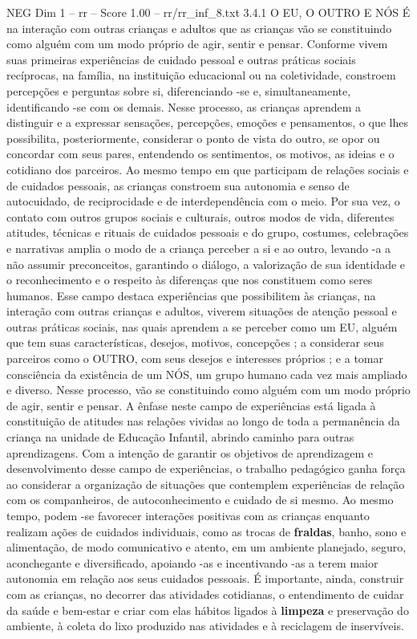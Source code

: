\begin{textsample}{NEG Dim 1 – rr – Score 1.00 – rr/rr\_inf\_8.txt}  \label{ex:f1_neg_072}
3.4.1 O EU, O OUTRO E NÓS É na interação com outras crianças e adultos que as crianças vão se constituindo como alguém com um modo próprio de agir, sentir e pensar.
Conforme vivem suas primeiras experiências de cuidado pessoal e outras práticas sociais recíprocas, na família, na instituição educacional ou na coletividade, constroem percepções e perguntas sobre si, diferenciando -se e, simultaneamente, identificando -se com os demais.
Nesse processo, as crianças aprendem a distinguir e a expressar sensações, percepções, emoções e pensamentos, o que lhes possibilita, posteriormente, considerar o ponto de vista do outro, se opor ou concordar com seus pares, entendendo os sentimentos, os motivos, as ideias e o cotidiano dos parceiros.
Ao mesmo tempo em que participam de relações sociais e de cuidados pessoais, as crianças constroem sua autonomia e senso de autocuidado, de reciprocidade e de interdependência com o meio.
Por sua vez, o contato com outros grupos sociais e culturais, outros modos de vida, diferentes atitudes, técnicas e rituais de cuidados pessoais e do grupo, costumes, celebrações e narrativas amplia o modo de a criança perceber a si e ao outro, levando -a a não assumir preconceitos, garantindo o diálogo, a valorização de sua identidade e o reconhecimento e o respeito às diferenças que nos constituem como seres humanos.
Esse campo destaca experiências que possibilitem às crianças, na interação com outras crianças e adultos, viverem situações de atenção pessoal e outras práticas sociais, nas quais aprendem a se perceber como um EU, alguém que tem suas características, desejos, motivos, concepções ; a considerar seus parceiros como o OUTRO, com seus desejos e interesses próprios ; e a tomar consciência da existência de um NÓS, um grupo humano cada vez mais ampliado e diverso.
Nesse processo, vão se constituindo como alguém com um modo próprio de agir, sentir e pensar.
A ênfase neste campo de experiências está ligada à constituição de atitudes nas relações vividas ao longo de toda a permanência da criança na unidade de Educação Infantil, abrindo caminho para outras aprendizagens.
Com a intenção de garantir os objetivos de aprendizagem e desenvolvimento desse campo de experiências, o trabalho pedagógico ganha força ao considerar a organização de situações que contemplem experiências de relação com os companheiros, de autoconhecimento e cuidado de si mesmo.
Ao mesmo tempo, podem -se favorecer interações positivas com as crianças enquanto realizam ações de cuidados individuais, como as trocas de \textbf{fraldas}, banho, sono e alimentação, de modo comunicativo e atento, em um ambiente planejado, seguro, aconchegante e diversificado, apoiando -as e incentivando -as a terem maior autonomia em relação aos seus cuidados pessoais.
É importante, ainda, construir com as crianças, no decorrer das atividades cotidianas, o entendimento de cuidar da saúde e bem-estar e criar com elas hábitos ligados à \textbf{limpeza} e preservação do ambiente, à coleta do lixo produzido nas atividades e à reciclagem de inservíveis.

\end{textsample}
